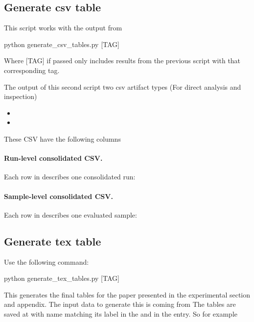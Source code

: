 \documentclass[11pt]{article}
\begin{document}
\subsection{Generate csv table}
This script works with the output from 
\begin{DocCode}
  python generate_csv_tables.py [TAG]
\end{DocCode}
Where [TAG] if passed only includes results from the previous script with that corresponding tag.

The output of this second script two csv artifact types (For direct analysis and inspection)
\begin{itemize}
  \item {}
  \item {}
\end{itemize}

These CSV have the following columns

\paragraph{Run-level consolidated CSV.}
Each row in  describes one consolidated run:

\allRunsCsvSchemaTable

\paragraph{Sample-level consolidated CSV.}
Each row in  describes one evaluated sample:

\allSamplesCsvSchemaTable

\FloatBarrier
\subsection{Generate tex table}
Use the following command:
\begin{DocCode}
  python generate_tex_tables.py [TAG]
\end{DocCode}
This generates the final tables for the paper presented in the experimental section and appendix.
The input data to generate this is coming from 
The tables are saved at  with name matching its label in the  and in the  entry.
So for example
\begin{DocCode}
\label{tab:acc_main_experiment_table}

\end{DocCode}
\end{document}
